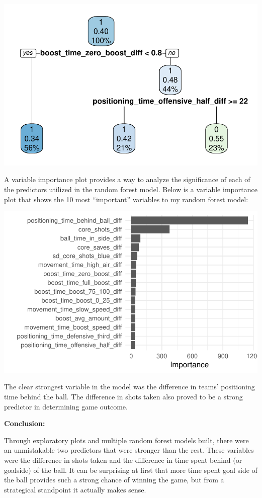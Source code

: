 \documentclass[
  letterpaper,
  DIV=11,
  numbers=noendperiod]{scrartcl}
\begin{document}
\includegraphics{RL_Write_Up_files/figure-pdf/unnamed-chunk-6-1.pdf}

A variable importance plot provides a way to analyze the significance of
each of the predictors utilized in the random forest model. Below is a
variable importance plot that shows the 10 most ``important'' variables
to my random forest model:

\includegraphics{RL_Write_Up_files/figure-pdf/unnamed-chunk-7-1.pdf}

The clear strongest variable in the model was the difference in teams'
positioning time behind the ball. The difference in shots taken also
proved to be a strong predictor in determining game outcome.

\textbf{Conclusion:}

Through exploratory plots and multiple random forest models built, there
were an unmistakable two predictors that were stronger than the rest.
These variables were the difference in shots taken and the difference in
time spent behind (or goalside) of the ball. It can be surprising at
first that more time spent goal side of the ball provides such a strong
chance of winning the game, but from a strategical standpoint it
actually makes sense.
\end{document}
